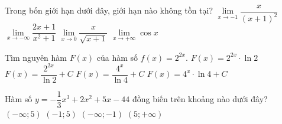 \begin{ex}%
Trong bốn giới hạn dưới đây, giới hạn nào không tồn tại?    
\choice
{$\lim\limits_{x\rightarrow -1}\dfrac{x}{(x+1)^2}$}
{$\lim\limits_{x\rightarrow -\infty}\dfrac{2x+1}{x^2+1}$}
{$\lim\limits_{x\rightarrow 0}\dfrac{x}{\sqrt{x+1}}$}
{\True $\lim\limits_{x\rightarrow +\infty}\cos x$}
\end{ex}

\begin{ex}%
Tìm nguyên hàm $F(x)$ của hàm số $f(x)=2^{2x}$.
\choice
{$F(x)=2^{2x}\cdot\ln2$}
{$F(x)=\dfrac{2^{2x}}{\ln2}+C$}
{\True $F(x)=\dfrac{4^x}{\ln4}+C$}
{$F(x)=4^x\cdot\ln4+C$}
\end{ex}

\begin{ex}%
Hàm số $y=-\dfrac{1}{3}x^3+2x^2+5x-44$ đồng biến trên khoảng nào dưới đây?
\choice
{$(-\infty;5)$}
{\True $(-1;5)$}
{$(-\infty;-1)$}
{$(5;+\infty)$}
\end{ex}

